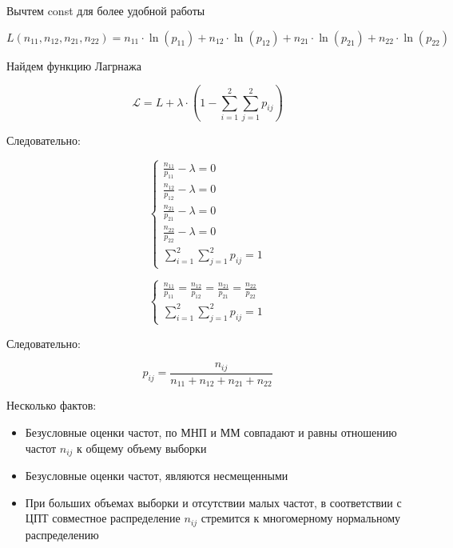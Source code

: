 \documentclass{article}
\begin{document}
    Вычтем const для более удобной работы

    \begin{equation}
        L(n_{11}, n_{12}, n_{21}, n_{22}) = n_{11} \cdot \ln(p_{11}) + n_{12} \cdot \ln(p_{12}) + n_{21} \cdot \ln(p_{21}) + n_{22} \cdot \ln(p_{22})
    \end{equation}

    Найдем функцию Лагрнажа

    \begin{equation}
        \mathcal{L} = L + \lambda \cdot (1 - \sum_{i=1}^{2}{\sum_{j=1}^{2}{p_{ij}}})
    \end{equation}

    Следовательно:

    \[
    \begin{cases}
       \frac{n_{11}}{p_{11}} - \lambda = 0 \\
       \frac{n_{12}}{p_{12}} - \lambda = 0 \\
       \frac{n_{21}}{p_{21}} - \lambda = 0 \\
       \frac{n_{22}}{p_{22}} - \lambda = 0 \\
       \sum_{i=1}^{2}{\sum_{j=1}^{2}{p_{ij}}} = 1
    \end{cases}
    \]

    \quad

    \[
    \begin{cases}
       \frac{n_{11}}{p_{11}} = \frac{n_{12}}{p_{12}} = \frac{n_{21}}{p_{21}} = \frac{n_{22}}{p_{22}} \\
       \sum_{i=1}^{2}{\sum_{j=1}^{2}{p_{ij}}} = 1
    \end{cases}
    \]

    Следовательно:

    \begin{equation}
        \widehat{p_{ij}} = \frac{n_{ij}}{n_{11} + n_{12} + n_{21} + n_{22}}
    \end{equation}


    Несколько фактов:

    \begin{itemize}
        \item Безусловные оценки частот, по МНП и ММ совпадают и равны отношению частот $n_{ij}$ к общему объему выборки
        \item Безусловные оценки частот, являются несмещенными
        \item При больших объемах выборки и отсутствии малых частот, в соответствии с ЦПТ совместное распределение $n_{ij}$ стремится к многомерному нормальному распределению
    \end{itemize}
\end{document}
